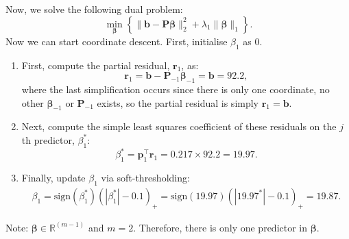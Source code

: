 \documentclass[11pt]{report} %
\begin{document}
Now, we solve the following dual problem:
  \[
\min_{\boldsymbol{\beta}} \left\{ \| \mathbf{b} - \mathbf{P} \boldsymbol{\beta} \|_2^2 + \lambda_1 \| \boldsymbol{\beta} \|_1 \right\}.
\]
Now we can start coordinate descent. First, initialise $\beta_1$ as 0.
\begin{enumerate}
    \item First, compute the partial residual, $\mathbf{r}_1$, as:
\[
\mathbf{r}_1 = \mathbf{b} - \mathbf{P}_{-1} \boldsymbol{\beta}_{-1}=\mathbf{b} = 92.2,
\]
where the last simplification occurs since there is only one coordinate, no other \( \boldsymbol{\beta}_{-1} \) or \( \mathbf{P}_{-1} \) exists, so the partial residual is simply \( \mathbf{r}_1 = \mathbf{b} \).

\item Next, compute the simple least squares coefficient of these residuals on the $j$th predictor, $\beta_1^*$:
\[
\beta_1^* = \mathbf{p}_1^\top \mathbf{r}_1=0.217 \times 92.2=19.97.
\]
\item Finally, update \(\beta_1\) via soft-thresholding:
\begin{align*}
\beta_1 = \text{sign}(\beta_1^*) \left( |\beta_1^*| - 0.1 \right)_+=\text{sign}(19.97) \left( |19.97^*| - 0.1 \right)_+=19.87.
\end{align*}
\end{enumerate}
\noindent Note: $\boldsymbol{\beta}\in\mathbb{R}^{(m-1)}$ and $m=2$. Therefore, there is only one predictor in $\boldsymbol{\beta}$. 
\end{document}
